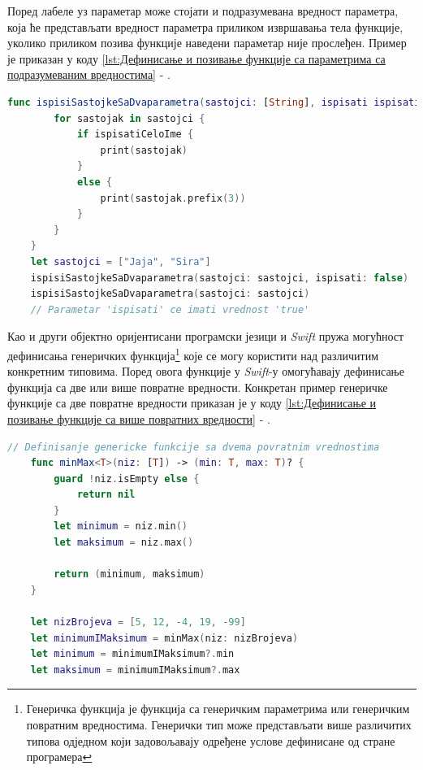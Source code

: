 \documentclass[12pt,oneside]{memoir}
\begin{document}
\indent Поред лабеле уз параметар може стојати и подразумевана вредност параметра, која ће представљати вредност параметра приликом извршавања тела функције, уколико приликом позива функције наведени параметар није прослеђен. Пример је приказан у коду \ref{lst:Дефинисање и позивање функције са параметрима са подразумеваним вредностима} - .
    
\begin{lstlisting}[caption=\textit{{Дефинисање и позивање функције са параметрима са подразумеваним вредностима}}, label={lst:Дефинисање и позивање функције са параметрима са подразумеваним вредностима}, language=Swift, frame=single]
    func ispisiSastojkeSaDvaparametra(sastojci: [String], ispisati ispisatiCeloIme: Bool = true) {
        for sastojak in sastojci {
            if ispisatiCeloIme {
                print(sastojak)
            }
            else {
                print(sastojak.prefix(3))
            }
        }
    }
    let sastojci = ["Jaja", "Sira"]
    ispisiSastojkeSaDvaparametra(sastojci: sastojci, ispisati: false)
    ispisiSastojkeSaDvaparametra(sastojci: sastojci)
    // Parametar 'ispisati' ce imati vrednost 'true'
\end{lstlisting}

\indent Као и други објектно оријентисани програмски језици и \textit{Swift} пружа могућност дефинисања генеричких функција\footnote{Генеричка функција је функција са генеричким параметрима или генеричким повратним вредностима. Генерички тип може представљати више различитих типова одједном који задовољавају одређене услове дефинисане од стране програмера} које се могу користити над различитим конкретним типовима. Поред овога функције у \textit{Swift}-у омогућавају дефинисање функција са две или више повратне вредности. Конкретан пример генеричке функције са две повратне вредности приказан је у коду \ref{lst:Дефинисање и позивање функције са више повратних вредности} - . 

\begin{lstlisting}[caption=\textit{{Дефинисање и позивање функције са више повратних вредности}}, label={lst:Дефинисање и позивање функције са више повратних вредности}, language=Swift, frame=single]
    // Definisanje genericke funkcije sa dvema povratnim vrednostima
    func minMax<T>(niz: [T]) -> (min: T, max: T)? {
        guard !niz.isEmpty else {
            return nil
        }
        let minimum = niz.min()
        let maksimum = niz.max()
        
        return (minimum, maksimum)
    }
    
    let nizBrojeva = [5, 12, -4, 19, -99]
    let minimumIMaksimum = minMax(niz: nizBrojeva)
    let minimum = minimumIMaksimum?.min
    let maksimum = minimumIMaksimum?.max
\end{lstlisting}
\end{document}
